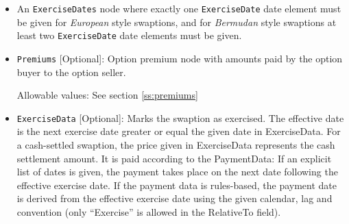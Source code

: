 \begin{itemize}
\item An \lstinline!ExerciseDates! node where exactly one \lstinline!ExerciseDate! date element must be given for \emph{European} style swaptions, and for \emph{Bermudan} style swaptions  at least two \lstinline!ExerciseDate! date elements must be given. \\

\item \lstinline!Premiums! [Optional]: Option premium node with amounts paid by the option buyer to the option seller.

Allowable values:  See section \ref{ss:premiums}

\item \lstinline!ExerciseData! [Optional]: Marks the swaption as exercised. The effective date is the next exercise date
  greater or equal the given date in ExerciseData. For a cash-settled swaption, the price given in ExerciseData
  represents the cash settlement amount. It is paid according to the PaymentData: If an explicit list of dates is given,
  the payment takes place on the next date following the effective exercise date. If the payment data is rules-based,
  the payment date is derived from the effective exercise date using the given calendar, lag and convention (only
  ``Exercise'' is allowed in the RelativeTo field).

\end{itemize}




